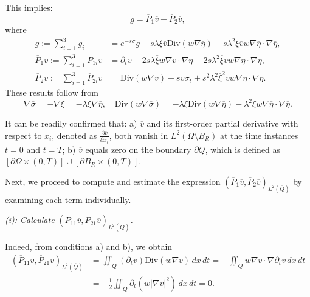 \documentclass[11pt]{article}
\numberwithin{equation}{section}
\begin{document}
This implies:
$$
\overline{g} = \overline{P}_1 \overline{v} + \overline{P}_2 \overline{v},
$$
where
$$
\begin{aligned}
	\overline{g} := \sum_{i=1}^3 \overline{g}_i
	&= e^{-s\overline{\sigma}}g + s\lambda \overline{\xi} \overline{v} \text{Div}(w \nabla \overline{\eta}) - s\lambda^2 \overline{\xi} \overline{v} w \nabla \overline{\eta} \cdot \nabla \overline{\eta}, \\
	\overline{P}_1 \overline{v} := \sum_{i=1}^3 P_{1i} \overline{v}
	&= \partial_t \overline{v} - 2s\lambda \overline{\xi} w \nabla \overline{v} \cdot \nabla \overline{\eta} - 2s\lambda^2 \overline{\xi} \overline{v} w \nabla \overline{\eta} \cdot \nabla \overline{\eta}, \\
	\overline{P}_2 \overline{v} := \sum_{i=1}^3 \overline{P}_{2i} \overline{v}
	&= \text{Div}(w \nabla \overline{v}) + s \overline{v} \overline{\sigma}_t + s^2 \lambda^2 \overline{\xi}^2 \overline{v} w \nabla \overline{\eta} \cdot \nabla \overline{\eta}.
\end{aligned}
$$
These results follow from
$$
\nabla \overline{\sigma} = -\nabla \overline{\xi} = -\lambda \overline{\xi} \nabla \overline{\eta}, \quad \text{Div}(w \nabla \overline{\sigma}) = -\lambda \overline{\xi} \text{Div}(w \nabla \overline{\eta}) - \lambda^2 \overline{\xi} w \nabla \overline{\eta} \cdot \nabla \overline{\eta}.
$$


It can be readily confirmed that:
a) $\overline{v}$ and its first-order partial derivative with respect to $x_i$, denoted as $\frac{\partial \overline{v}}{\partial x_i}$, both vanish in $L^2(\Omega \setminus B_R)$ at the time instances $t=0$ and $t=T$;
b) $\overline{v}$ equals zero on the boundary $\partial \overline{Q}$, which is defined as $[\partial \Omega \times (0,T)] \cup [\partial B_R \times (0,T)]$.

Next, we proceed to compute and estimate the expression $(\overline{P}_1 \overline{v}, \overline{P}_2 \overline{v})_{L^2(\overline{Q})}$ by examining each term individually.

{\it (i): Calculate $(\overline{P}_{11} \overline{v}, \overline{P}_{21} \overline{v})_{L^2(\overline{Q})}$.}

Indeed, from conditions a) and b), we obtain
\begin{equation*}
	\begin{split}
		(\overline{P}_{11} \overline{v}, \overline{P}_{21} \overline{v})_{L^2(\overline{Q})}
		&= \iint_{\overline{Q}} (\partial_t \overline{v}) \text{Div}(w \nabla \overline{v}) \, dx \, dt = -\iint_{\overline{Q}} w \nabla \overline{v} \cdot \nabla \partial_t \overline{v} \, dx \, dt\\
		&= -\frac{1}{2} \iint_{\overline{Q}} \partial_t \left(w |\nabla \overline{v}|^2\right) \, dx \, dt = 0.
	\end{split}
\end{equation*}
\end{document}
